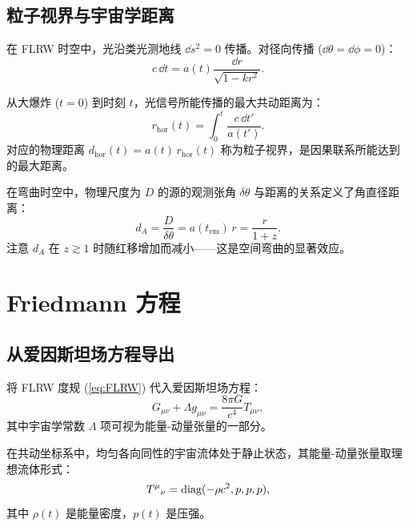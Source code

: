 \subsection{粒子视界与宇宙学距离}

在 FLRW 时空中，光沿类光测地线 $\dd s^2 = 0$ 传播。对径向传播 ($\dd\theta = \dd\phi = 0$)：
\begin{equation}
    c\,\dd t = a(t) \frac{\dd r}{\sqrt{1 - k r^2}}.
\end{equation}

\begin{definition}
从大爆炸 ($t=0$) 到时刻 $t$，光信号所能传播的最大共动距离为：
\begin{equation}
    \boxed{r_{\text{hor}}(t) = \int_0^t \frac{c\,\dd t'}{a(t')}}.
    \label{eq:particle_horizon}
\end{equation}
对应的物理距离 $d_{\text{hor}}(t) = a(t) \, r_{\text{hor}}(t)$ 称为粒子视界，是因果联系所能达到的最大距离。
\end{definition}

\begin{definition}
在弯曲时空中，物理尺度为 $D$ 的源的观测张角 $\delta\theta$ 与距离的关系定义了角直径距离：
\begin{equation}
    \boxed{d_A = \frac{D}{\delta\theta} = a(t_{\text{em}}) \, r = \frac{r}{1+z}}.
    \label{eq:angular_diameter}
\end{equation}
注意 $d_A$ 在 $z \gtrsim 1$ 时随红移增加而减小——这是空间弯曲的显著效应。
\end{definition}

\section{Friedmann 方程}
\label{sec:Friedmann}

\subsection{从爱因斯坦场方程导出}

将 FLRW 度规 (\ref{eq:FLRW}) 代入爱因斯坦场方程：
\begin{equation}
    G_{\mu\nu} + \Lambda g_{\mu\nu} = \frac{8\pi G}{c^4} T_{\mu\nu},
\end{equation}
其中宇宙学常数 $\Lambda$ 项可视为能量-动量张量的一部分。

在共动坐标系中，均匀各向同性的宇宙流体处于静止状态，其能量-动量张量取理想流体形式：
\begin{equation}
    T^{\mu}{}_{\nu} = \operatorname{diag}(-\rho c^2, p, p, p),
\end{equation}
其中 $\rho(t)$ 是能量密度，$p(t)$ 是压强。

